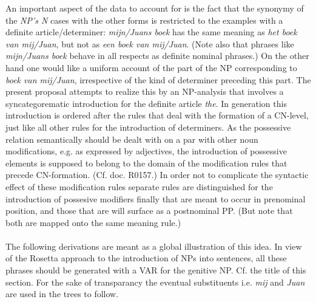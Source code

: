 An important aspect of the data to account for is the fact that the synonymy of
the {\em NP's N} cases with the other forms is restricted to the examples with
a definite article/determiner: {\em mijn/Juans boek} has the same meaning as
{\em het boek van mij/Juan}, but not as {\em een boek van mij/Juan}. (Note also
that phrases like {\em mijn/Juans boek} behave in all respects as definite
nominal phrases.) On the other hand one would like a uniform account of the
part of the NP corresponding to {\em boek van mij/Juan}, irrespective of the
kind of determiner preceding this part. The present proposal attempts to
realize this by an NP-analysis that involves a syncategorematic introduction
for the definite article {\em the}. In generation this introduction is ordered
after the rules that deal with the formation of a CN-level, just like all other
rules for the introduction of determiners. As the possessive relation
semantically should be dealt with on a par with other noun modifications, e.g.
as expressed by adjectives, the introduction of possessive elements is supposed
to belong to the domain of the modification rules that precede CN-formation.
(Cf. doc. R0157.) In order not to complicate the syntactic effect of these 
modification rules separate rules are distinguished for the introduction
of possesive modifiers finally that are meant to occur in prenominal 
position, and those that are will surface as a postnominal PP. (But note 
that both are 
mapped  onto the same meaning rule.)
\\ \\
The following derivations are meant as a global illustration of this idea.
In view of the Rosetta approach to the introduction of NPs into
sentences, all these phrases should be generated with a VAR for the genitive NP.
Cf. the title of this section. For the sake of transparancy the eventual
substituents i.e. {\em mij} and {\em Juan} are used in the trees to follow.
\newpage
